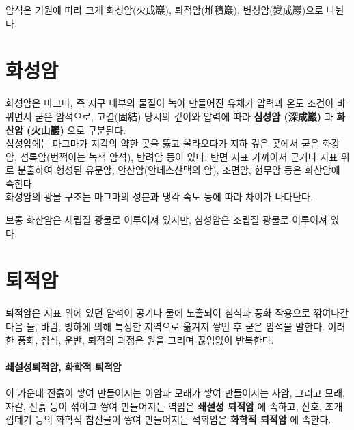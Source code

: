 \documentclass[12pt, a4paper, twoside]{book}
\begin{document}
			

			암석은 기원에 따라 크게 화성암(火成巖), 퇴적암(堆積巖), 변성암(變成巖)으로 나뉜다. 

	\clearpage
	\section{화성암}

				화성암은 마그마, 즉 지구 내부의 물질이 녹아 만들어진 유체가 압력과 온도 조건이 바뀌면서 굳은 암석으로, 
				고결(固結) 당시의 깊이와 압력에 따라 \textbf{ 심성암 (深成巖) }과 \textbf{ 화산암 (火山巖) }으로 구분된다. \\
				
				심성암에는 마그마가 지각의 약한 곳을 뚫고 올라오다가 지하 깊은 곳에서 굳은 화강암, 섬록암(번쩍이는 녹색 암석), 반려암 등이 있다. 
				반면 지표 가까이서 굳거나 지표 위로 분출하여 형성된 유문암, 안산암(안데스산맥의 암), 조면암, 현무암 등은 화산암에 속한다.  \\
				
				화성암의 광물 구조는 마그마의 성분과 냉각 속도 등에 따라 차이가 나타난다. 
				
				보통 화산암은 세립질 광물로 이루어져 있지만, 심성암은 조립질 광물로 이루어져 있다.



	\clearpage
	\section{퇴적암}

				퇴적암은 지표 위에 있던 암석이 공기나 물에 노출되어 침식과 풍화 작용으로 깎여나간 다음 
				물, 바람, 빙하에 의해 특정한 지역으로 옮겨져 쌓인 후 굳은 암석을 말한다. 
				이러한 풍화, 침식, 운반, 퇴적의 과정은 원을 그리며 끊임없이 반복한다.  
				
				\paragraph{쇄설성퇴적암, 화학적 퇴적암} 
				이 가운데 진흙이 쌓여 만들어지는 이암과 모래가 쌓여 만들어지는 사암, 그리고 모래, 자갈, 진흙 등이 섞이고 쌓여 만들어지는 역암은 
				\textbf{ 쇄설성 퇴적암 }에 속하고, 
				산호, 조개 껍데기 등의 화학적 침전물이 쌓여 만들어지는 석회암은 \textbf{ 화학적 퇴적암 }에 속한다. 
\end{document}
